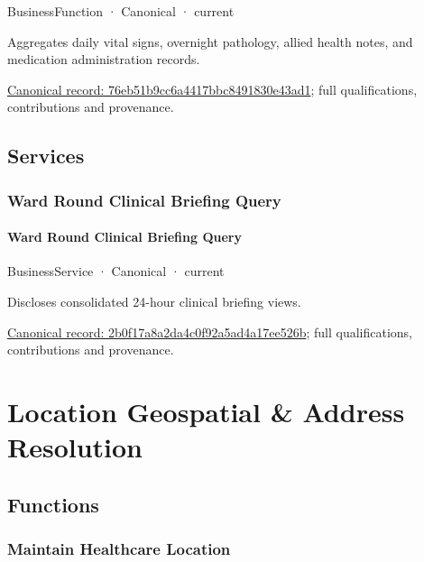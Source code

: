\label{element:76eb51b9cc6a4417bbc8491830e43ad1}
{\small BusinessFunction · Canonical · current}\par

Aggregates daily vital signs, overnight pathology, allied health notes, and medication administration records.


{\footnotesize \href{../../../../continuum/business/business-function/76eb51b9cc6a4417bbc8491830e43ad1.md}{Canonical record: 76eb51b9cc6a4417bbc8491830e43ad1}; full qualifications, contributions and provenance.}\par
\subsection{Services}

\subsubsection{Ward Round Clinical Briefing Query}

\paragraph{Ward Round Clinical Briefing Query}

\label{element:2b0f17a8a2da4c0f92a5ad4a17ee526b}
{\small BusinessService · Canonical · current}\par

Discloses consolidated 24-hour clinical briefing views.


{\footnotesize \href{../../../../continuum/business/business-service/2b0f17a8a2da4c0f92a5ad4a17ee526b.md}{Canonical record: 2b0f17a8a2da4c0f92a5ad4a17ee526b}; full qualifications, contributions and provenance.}\par
\section{Location Geospatial \& Address Resolution}

\subsection{Functions}

\subsubsection{Maintain Healthcare Location}

